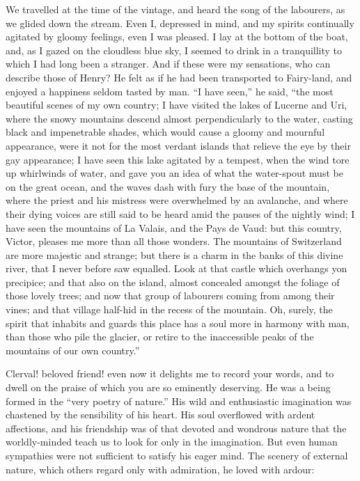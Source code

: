 We travelled at the time of the vintage,
and heard the song of the labourers,
as we glided down the stream.
Even I, depressed in mind, and my
spirits continually agitated by gloomy
feelings, even I was pleased. I lay at
the bottom of the boat, and, as I gazed
on the cloudless blue sky, I seemed
to drink in a tranquillity to which I
had long been a stranger. And if these
were my sensations, who can describe
those of Henry? He felt as if he had
been transported to Fairy-land, and enjoyed
a happiness seldom tasted by
man. ``I have seen,'' he said, ``the
most beautiful scenes of my own
country; I have visited the lakes of
Lucerne and Uri, where the snowy
mountains descend almost perpendicularly
to the water, casting black and impenetrable
shades, which would cause
a gloomy and mournful appearance,
were it not for the most verdant islands
that relieve the eye by their gay appearance;
I have seen this lake agitated
by a tempest, when the wind tore up
whirlwinds of water, and gave you an
idea of what the water-spout must be
on the great ocean, and the waves dash
with fury the base of the mountain,
where the priest and his mistress were
overwhelmed by an avalanche, and
where their dying voices are still said
to be heard amid the pauses of the
nightly wind; I have seen the mountains
of La Valais, and the Pays de
Vaud: but this country, Victor, pleases
me more than all those wonders. The
mountains of Switzerland are more
majestic and strange; but there is a
charm in the banks of this divine river,
that I never before saw equalled. Look
at that castle which overhangs yon precipice;
and that also on the island, almost
concealed amongst the foliage of
those lovely trees; and now that group
of labourers coming from among their
vines; and that village half-hid in the
recess of the mountain. Oh, surely,
the spirit that inhabits and guards
this place has a soul more in harmony
with man, than those who pile
the glacier, or retire to the inaccessible
peaks of the mountains of our own
country.''

Clerval! beloved friend! even now
it delights me to record your words, and
to dwell on the praise of which you are
so eminently deserving. He was a
being formed in the ``very poetry of
nature.'' His wild and enthusiastic
imagination was chastened by the sensibility
of his heart. His soul overflowed
with ardent affections, and his
friendship was of that devoted and wondrous
nature that the worldly-minded
teach us to look for only in the imagination.
But even human sympathies
were not sufficient to satisfy his eager
mind. The scenery of external nature,
which others regard only with admiration,
he loved with ardour:

